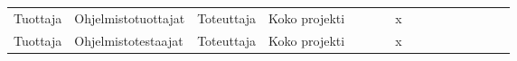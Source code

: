 \begin{table}[]
\begin{tabular}{llllllllllllllll}
Tuottaja                                                                                                                                           & Ohjelmistotuottajat                                                                                                 & Toteuttaja                                                                                                       & Koko projekti                                                                                  &                                                                                    &                                  &                                   & x                                      &                                                                                         &                                      &                                                       &                                      &                                                                                                    &                                     &                                   &                                 \\
Tuottaja                                                                                                                                           & Ohjelmistotestaajat                                                                                                 & Toteuttaja                                                                                                       & Koko projekti                                                                                  &                                                                                    &                                  &                                   & x                                      &                                                                                         &                                      &                                                       &                                      &                                                                                                    &                                     &                                   &                                 \\

\end{tabular}
\end{table}
